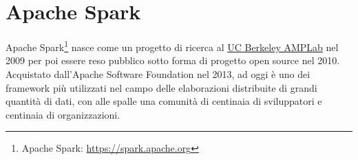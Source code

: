 \section{Apache Spark} \label{spark}
Apache Spark\footnote{Apache Spark:  \href{https://spark.apache.org}{https://spark.apache.org}} nasce come un progetto di ricerca al \href{https://amplab.cs.berkeley.edu/}{UC Berkeley AMPLab} nel 2009 per poi essere reso pubblico sotto forma di progetto open source nel 2010. Acquistato dall'Apache Software Foundation nel 2013, ad oggi è uno dei framework più utilizzati nel campo delle elaborazioni distribuite di grandi quantità di dati, con alle spalle una comunità di centinaia di sviluppatori e centinaia di organizzazioni.






